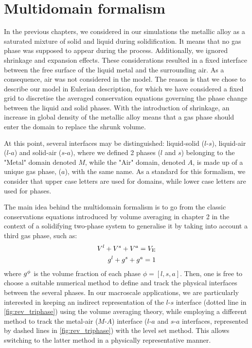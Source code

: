 \section{Multidomain formalism}
In the previous chapters, we considered in our simulations the metallic alloy as a 
saturated mixture of solid and liquid during solidification.
It means that no gas phase was supposed to appear during the process.
Additionally, we ignored shrinkage and expansion effects. These considerations
resulted in a fixed interface between the free surface of the liquid metal and the surrounding air.
As a consequence, air was not considered in the model.
The reason is that we chose to describe our model in Eulerian description, 
for which we have considered a fixed grid to discretise the averaged conservation 
equations governing the phase change between the liquid and solid phases.
With the introduction of shrinkage, an increase in global density of the metallic alloy means 
that a gas phase should enter the domain to replace the shrunk volume.

At this point, several interfaces may be distinguished: liquid-solid ($l$-$s$), liquid-air ($l$-$a$) and solid-air ($s$-$a$), where 
we defined 2 phases ($l$ and $s$) belonging to the "Metal" domain denoted $M$, while the "Air" domain, denoted $A$, 
is made up of a unique gas phase, ($a$), with the same name. As a standard for this formalism, we consider that upper case letters
are used for domains, while lower case letters are used for phases.

The main idea behind the multidomain formalism is to go from the classic 
conservations equations introduced by volume averaging in chapter 2
in the context of a solidifying two-phase system to generalise it by taking
into account a third gas phase, such as:
\begin{align}
\label{eq:}
V^l + V^s + V^a = V_\text{E} \\
{g^l} + {g^s} + {g^a} = 1
\end{align} 
where ${g^{\phi}} $ is the volume fraction of each phase $\phi=[l,s,a]$.
Then, one is free to choose a suitable numerical method to define and track the 
physical interfaces between the several phases. In our macroscale applications, we are particularly 
interested in keeping an indirect representation of the $l$-$s$ interface (dotted line in \cref{fig:rev_triphase})
using the volume averaging theory, while employing a different
method to track the metal-air ($M$-$A$) interface ($l$-$a$ and $s$-$a$ interfaces, represented by dashed lines in \cref{fig:rev_triphase}) with the level set method. 
This allows switching to the latter method in a physically representative manner.

